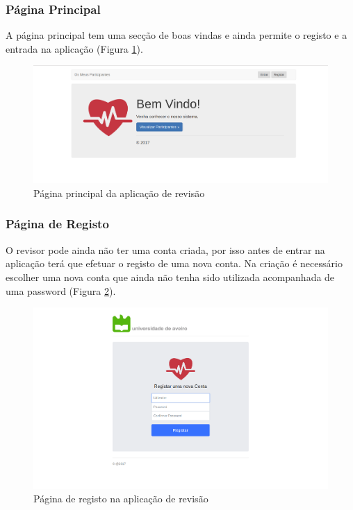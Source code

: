 \subsubsection{Página Principal}
A página principal tem uma secção de boas vindas e ainda permite o registo e a entrada na aplicação (Figura \ref{f:web-home}).

\begin{figure}[H]
\centering
\includegraphics[width=1\textwidth]{imgs/home.png}
\caption[Página principal da aplicação de revisão]{Página principal da aplicação de revisão}
\label{f:web-home}
\end{figure}

\subsubsection{Página de Registo}
O revisor pode ainda não ter uma conta criada, por isso antes de entrar na aplicação terá que efetuar o registo de uma nova conta. Na criação é necessário escolher uma nova conta que ainda não tenha sido utilizada acompanhada de uma password (Figura \ref{f:web-registo}).

\begin{figure}[H]
\centering
\includegraphics[width=1\textwidth]{imgs/signup_web.png}
\caption[Página de registo na aplicação de revisão]{Página de registo na aplicação de revisão}
\label{f:web-registo}
\end{figure}

